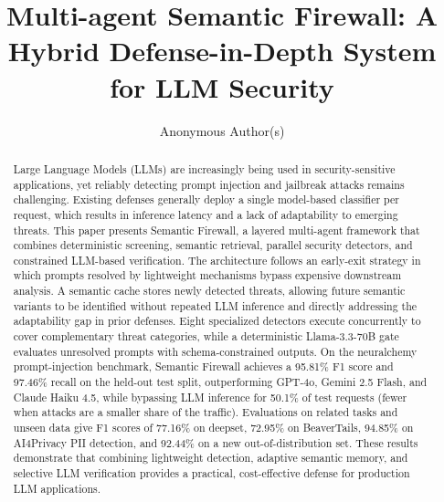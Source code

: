\documentclass[runningheads]{llncs}
\newif\ifrev
\newcommand{\rev}[1]{\ifrev\hl{#1}\else#1\fi}                  %
\begin{document}
\title{Multi-agent Semantic Firewall: A Hybrid Defense-in-Depth System for LLM Security}


\author{Anonymous Author(s)}



\maketitle

\begin{abstract}
Large Language Models (LLMs) are increasingly being used in security-sensitive applications, yet reliably detecting prompt injection and jailbreak attacks remains challenging. Existing defenses generally deploy a single model-based classifier per request, which results in inference latency and a lack of adaptability to emerging threats. This paper presents Semantic Firewall, a layered multi-agent framework that combines deterministic screening, semantic retrieval, parallel security detectors, and constrained LLM-based verification. The architecture follows an early-exit strategy in which prompts resolved by lightweight mechanisms bypass expensive downstream analysis. A semantic cache stores newly detected threats, allowing future semantic variants to be identified without repeated LLM inference and directly addressing the adaptability gap in prior defenses. Eight specialized detectors execute concurrently to cover complementary threat categories, while a deterministic Llama-3.3-70B gate evaluates unresolved prompts with schema-constrained outputs. On the neuralchemy prompt-injection benchmark, Semantic Firewall achieves a \rev{95.81\%} F1 score and \rev{97.46\%} recall \rev{on the held-out test split}, outperforming GPT-4o, Gemini 2.5 Flash, and \rev{Claude Haiku 4.5}, while bypassing LLM inference for \rev{50.1\%} of \rev{test} requests \rev{(fewer when attacks are a smaller share of the traffic)}. \rev{Evaluations on related tasks and unseen data give F1 scores of 77.16\% on deepset, 72.95\% on BeaverTails, 94.85\% on AI4Privacy PII detection, and 92.44\% on a new out-of-distribution set.} These results demonstrate that combining lightweight detection, adaptive semantic memory, and selective LLM verification provides a practical, cost-effective defense for production LLM applications.

\end{abstract}
\end{document}
